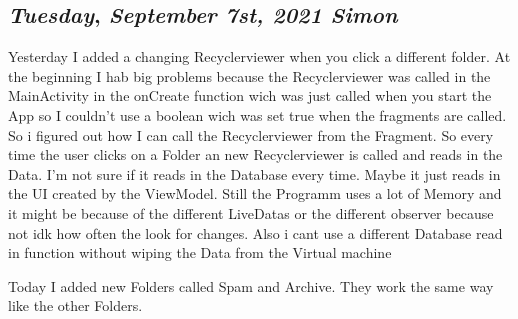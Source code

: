 \begin{center}
\section*{\month}
\end{center}


\def\day{\textit{September 7st, 2021 Simon}}
\def\weekday{\textit{Tuesday}}
\subsection*{\weekday, \day}

Yesterday I added a changing Recyclerviewer when you click a different folder.
At the beginning I hab big problems because the Recyclerviewer was called in the MainActivity
in the onCreate function wich was just called when you start the App so I couldn't use a boolean wich was set 
true when the fragments are called. So i figured out how I can call the Recyclerviewer from the Fragment. So every time 
the user clicks on a Folder an new Recyclerviewer is called and reads in the Data. I'm not sure if it reads in the Database every time. 
Maybe it just reads in the UI created by the ViewModel. Still the Programm uses a lot of Memory and it might be because of the 
different LiveDatas or the different observer because not idk how often the look for changes. Also i cant use a different Database read in function 
without wiping the Data from the Virtual machine

Today I added new Folders called Spam and Archive. They work the same way like the other Folders. 
